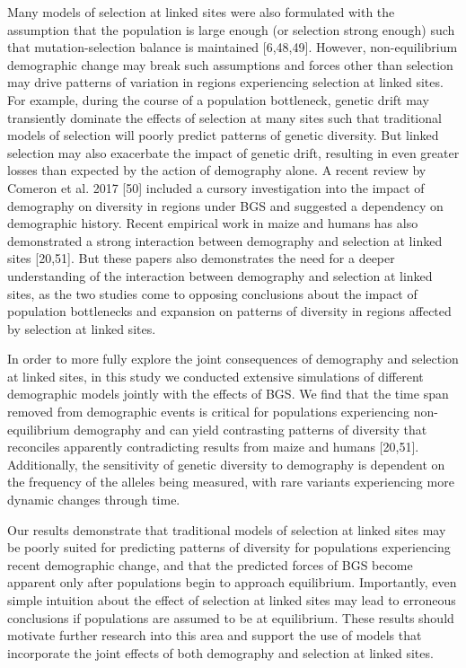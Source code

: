 \documentclass[9pt,twocolumn,twoside]{rilabRxiv}
\begin{document}
Many models of selection at linked sites were also formulated with the assumption that the population is large enough (or selection strong enough) such that mutation-selection balance is maintained [6,48,49].
However, non-equilibrium demographic change may break such assumptions and forces other than selection may drive patterns of variation in regions experiencing selection at linked sites. 
For example, during the course of a population bottleneck, genetic drift may transiently dominate the effects of selection at many sites such that traditional models of selection will poorly predict patterns of genetic diversity. 
But linked selection may also exacerbate the impact of genetic drift, resulting in even greater losses than expected by the action of demography alone. 
A recent review by Comeron et al. 2017 [50] included a cursory investigation into the impact of demography on diversity in regions under BGS and suggested a dependency on demographic history. 
Recent empirical work in maize and humans has also demonstrated a strong interaction between demography and selection at linked sites [20,51].
But these papers also demonstrates the need for a deeper understanding of the interaction between demography and selection at linked sites, as the two studies come to opposing conclusions about the impact of population bottlenecks and expansion on patterns of diversity  in regions affected by selection at linked sites.

In order to more fully explore the joint consequences of demography and selection at linked sites, in this study we conducted extensive simulations of different demographic models jointly with the effects of BGS. 
We find that the time span removed from demographic events is critical for populations experiencing non-equilibrium demography and can yield contrasting patterns of diversity that reconciles apparently contradicting results from maize and humans  [20,51].
Additionally, the sensitivity of genetic diversity to demography is dependent on the frequency of the alleles being measured, with rare variants experiencing more dynamic changes through time.

Our results demonstrate that traditional models of selection at linked sites may be poorly suited for predicting patterns of diversity for populations experiencing recent demographic change, and that the predicted forces of BGS become apparent only after populations begin to approach equilibrium. 
Importantly, even simple intuition about the effect of selection at linked sites may lead to erroneous conclusions if populations are assumed to be at equilibrium. 
These results should motivate further research into this area and support the use of models that incorporate the joint effects of both demography and selection at linked sites.
\end{document}
